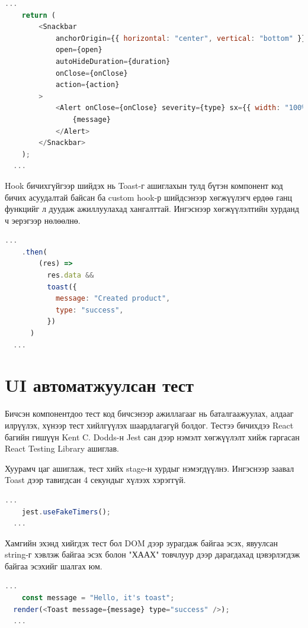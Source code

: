 \begin{lstlisting}[language=Javascript, caption=Material-UI ашиглаж интерфэйсийг үүсгэх, frame=single]
	...  
	return (
		<Snackbar
			anchorOrigin={{ horizontal: "center", vertical: "bottom" }}
			open={open}
			autoHideDuration={duration}
			onClose={onClose}
			action={action}
		>
			<Alert onClose={onClose} severity={type} sx={{ width: "100%" }}>
				{message}
			</Alert>
		</Snackbar>
	);
  ...
\end{lstlisting}

Hook бичихгүйгээр шийдэх нь Toast-г ашиглахын тулд бүтэн компонент код бичих асуудалтай байсан ба custom hook-р шийдсэнээр хөгжүүлэгч ердөө ганц функцийг л дуудаж ажиллуулахад хангалттай. Ингэснээр хөгжүүлэлтийн хурданд ч эерэгээр нөлөөлнө. 

\begin{lstlisting}[language=Javascript, caption=Toast-г дуудаж ашиглаж буй байдал, frame=single]
	...  
	.then(
        (res) =>
          res.data &&
          toast({
            message: "Created product",
            type: "success",
          })
      )
  ...
\end{lstlisting}
\pagebreak

\section{UI автоматжуулсан тест}

Бичсэн компонентдоо тест код бичсэнээр ажиллагааг нь баталгаажуулах, алдааг илрүүлэх, хүнээр тест хийлгүүлэх шаардлагагүй болдог. Тестээ бичихдээ React багийн гишүүн Kent C. Dodds-н Jest сан дээр нэмэлт хөгжүүлэлт хийж гаргасан React Testing Library ашиглав.

Хуурамч цаг ашиглаж, тест хийх stage-н хурдыг нэмэгдүүлнэ. Ингэснээр заавал Toast дээр тавигдсан 4 секундыг хүлээх хэрэггүй.

\begin{lstlisting}[language=Javascript, caption=FakeTimer ашиглах, frame=single]
	...  
	jest.useFakeTimers();
  ...
\end{lstlisting}

Хамгийн эхэнд хийгдэх тест бол DOM дээр зурагдаж байгаа эсэх, явуулсан string-г хэвлэж байгаа эсэх болон "ХААХ" товчлуур дээр дарагдахад цэвэрлэгдэж байгаа эсэхийг шалгах юм.

\begin{lstlisting}[language=Javascript, caption=Toast компонентийг DOM дээр зурна, frame=single]
	...  
	const message = "Hello, it's toast";
  render(<Toast message={message} type="success" />);
  ...
\end{lstlisting}

